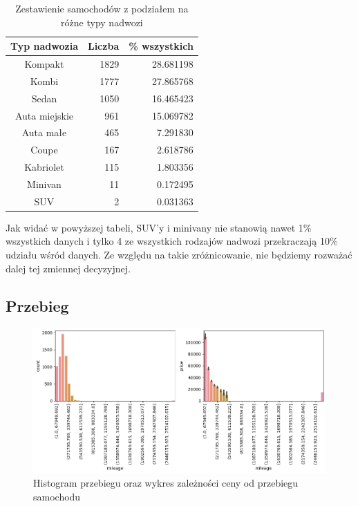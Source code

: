 \documentclass{article}
\begin{document}


\begin{table}[H]
    \centering
    \begin{tabular}{crr}
       \textbf{Typ nadwozia} & \textbf{Liczba} & \textbf{\% wszystkich} \\ \hline
        Kompakt & 1829 & 28.681198 \\
        Kombi & 1777 & 27.865768 \\
        Sedan & 1050 & 16.465423 \\
        Auta miejskie & 961 & 15.069782 \\
        Auta małe & 465 & 7.291830 \\
        Coupe & 167 & 2.618786 \\
        Kabriolet & 115 & 1.803356 \\
        Minivan & 11 & 0.172495 \\
        SUV & 2 & 0.031363 \\
    \end{tabular}
    \caption{Zestawienie samochodów z podziałem na różne typy nadwozi}
\end{table}

Jak widać w powyższej tabeli, SUV'y i minivany nie stanowią nawet 1\% wszystkich danych i tylko 4 ze wszystkich rodzajów nadwozi przekraczają 10\% udziału wśród danych. Ze względu na takie zróżnicowanie, nie będziemy rozważać dalej tej zmiennej decyzyjnej.

\subsection{Przebieg}
\begin{figure}[H]
    \centering
    \includegraphics[width=1\linewidth]{images/przebieg_przed.png}
    \caption{Histogram przebiegu oraz wykres zależności ceny od przebiegu samochodu}
    \label{plt:mileage_bef}
\end{figure}
\end{document}
